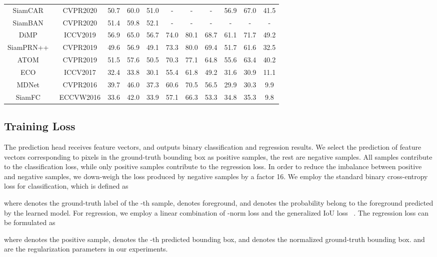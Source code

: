 \documentclass[final]{cvpr}
\begin{document}
\begin{table*}[!t]
\begin{center}
{\begin{tabular}{|c|c|ccc|ccc|ccc|}
SiamCAR~\cite{SiamCAR}	&CVPR2020	  &50.7	&60.0	&51.0	&-	&-	&-	&56.9	&67.0 	&41.5\\
SiamBAN~\cite{SiamBAN}	&CVPR2020	&51.4	&59.8	&52.1	&-	&-	&-	&-	&-	&-\\
DiMP~\cite{DiMP}	    &ICCV2019	&56.9	&65.0	&56.7	&74.0	&80.1	&68.7	&61.1	&71.7	&49.2\\
SiamPRN++~\cite{SiamRPNplusplus}&CVPR2019	&49.6	&56.9	&49.1	&73.3	&80.0	&69.4	&51.7	&61.6	&32.5\\
ATOM~\cite{ATOM}	    &CVPR2019	&51.5	&57.6	&50.5	&70.3	&77.1	&64.8	&55.6	&63.4	&40.2\\
ECO~\cite{ECO}	        &ICCV2017	&32.4	&33.8	&30.1	&55.4	&61.8	&49.2	&31.6	&30.9	&11.1\\
MDNet~\cite{MDNet}	    &CVPR2016	 &39.7	&46.0	&37.3	&60.6	&70.5	&56.5	&29.9	&30.3	&9.9\\
SiamFC~\cite{SiameseFC}	&ECCVW2016	&33.6	&42.0	&33.9	&57.1	&66.3	&53.3	&34.8	&35.3	&9.8\\
\hline
\end{tabular}}
\end{center}
\end{table*}

\subsection{Training Loss}
The prediction head receives  feature vectors, and outputs  binary 
classification and regression results. 
We select the prediction of feature vectors corresponding to pixels in the ground-truth bounding box 
as positive samples, the rest are negative samples. 
All samples contribute to the classification loss, while only positive samples contribute to the regression loss. 
In order to reduce the imbalance between positive and negative samples, we down-weigh the loss produced by negative 
samples by a factor 16. 
We employ the standard binary cross-entropy loss for classification, which is defined as

where  denotes the ground-truth label of the -th sample,  denotes foreground, and  denotes the probability belong to  
the foreground predicted by the learned model.
For regression, we employ a linear combination of -norm loss  
and the generalized IoU loss ~\cite{GIoU}. 
The regression loss can be formulated as

where  denotes the positive sample,  denotes the -th predicted bounding box, and 
 denotes the normalized ground-truth bounding box.
 and  are the regularization parameters in our experiments. 
\end{document}
